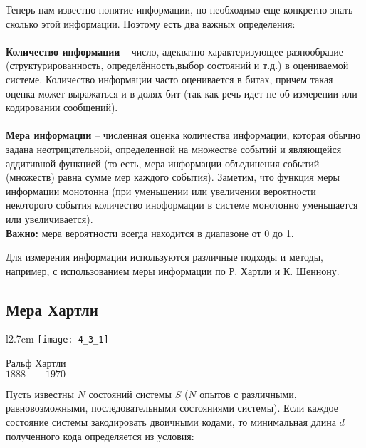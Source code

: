 Теперь нам известно понятие информации, но необходимо еще конкретно знать сколько этой информации. Поэтому есть два важных определения:
\\
\\\textbf{Количество информации} -- число, адекватно характеризующее разнообразие (структурированность, определённость,выбор состояний и т.д.) в оцениваемой системе. Количество информации часто оценивается в битах, причем такая оценка может выражаться и в долях бит (так как речь идет не об измерении или кодировании сообщений).
\\
\\\textbf{Мера информации} -- численная оценка количества информации, которая обычно задана неотрицательной, определенной на множестве событий и являющейся аддитивной функцией (то есть, мера информации объединения событий (множеств) равна сумме мер каждого события). Заметим, что функция меры информации монотонна (при уменьшении или увеличении вероятности некоторого события количество иноформации в системе монотонно уменьшается или увеличивается). 
\\\textbf{Важно:} мера вероятности всегда находится в диапазоне от 0 до 1.
\par
Для измерения информации используются различные подходы и методы, например, с использованием меры информации по Р. Хартли и К. Шеннону.

\newpage
\subsection{Мера Хартли}

\begin{wrapfigure}{l}{2.7cm}
\texttt{[image: 4\_3\_1]}
\begin{center}
\footnotesize{Ральф Хартли}
\\\footnotesize{$1888 -- 1970$}
\end{center}
\end{wrapfigure}

Пусть известны $N$ состояний системы $S$ ($N$  опытов с различными, равновозможными, последовательными состояниями системы). Если каждое состояние системы закодировать двоичными кодами, то минимальная длина $d$ полученного кода определяется из условия:

